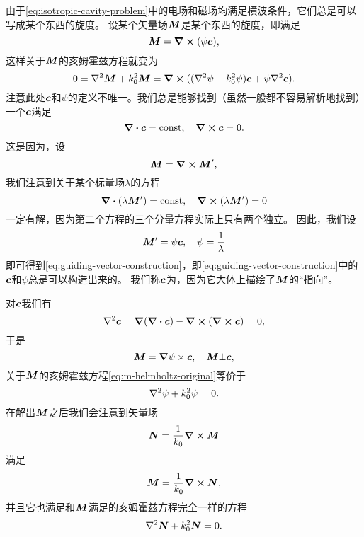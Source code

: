由于\eqref{eq:isotropic-cavity-problem}中的电场和磁场均满足横波条件，它们总是可以写成某个东西的旋度。
设某个矢量场$\vb*{M}$是某个东西的旋度，即满足
\begin{equation}
    {\vb*{M}} = \curl{(\psi \vb*{c})},
    \label{eq:guiding-vector-construction}
\end{equation}
这样关于$\vb*{M}$的亥姆霍兹方程就变为
\begin{equation}
    0 = \laplacian {\vb*{M}} + k_0^2 {\vb*{M}} = \curl{((\laplacian \psi + k_0^2 \psi) \vb*{c} + \psi \laplacian \vb*{c})}.
    \label{eq:m-helmholtz-original}
\end{equation}
注意此处$\vb*{c}$和$\psi$的定义不唯一。我们总是能够找到（虽然一般都不容易解析地找到）一个$\vb*{c}$满足
\begin{equation}
    \div{\vb*{c}} = \text{const}, \quad \curl{\vb*{c}} = 0.
\end{equation}
这是因为，设
\[
    \vb*{M} = \curl{\vb*{M}'},
\]
我们注意到关于某个标量场$\lambda$的方程
\[
    \div{(\lambda \vb*{M}')} = \text{const}, \quad \curl{(\lambda \vb*{M}')} = 0
\]
一定有解，因为第二个方程的三个分量方程实际上只有两个独立。
因此，我们设
\[
    \vb*{M}' = \psi \vb*{c}, \quad \psi = \frac{1}{\lambda}
\]
即可得到\eqref{eq:guiding-vector-construction}，即\eqref{eq:guiding-vector-construction}中的$\vb*{c}$和$\psi$总是可以构造出来的。
我们称$\vb*{c}$为，因为它大体上描绘了$\vb*{M}$的“指向”。

对$\vb*{c}$我们有
\[
    \laplacian \vb*{c} = \grad(\div{\vb*{c}}) - \curl{(\curl{\vb*{c}})} = 0,
\]
于是
\begin{equation}
    \vb*{M} = \grad{\psi} \times \vb*{c}, \quad \vb*{M} \bot \vb*{c},
\end{equation}
关于$\vb*{M}$的亥姆霍兹方程\eqref{eq:m-helmholtz-original}等价于
\begin{equation}
    \laplacian \psi + k_0^2 \psi = 0.
    \label{eq:scalar-cavity-eq}
\end{equation}
在解出$\vb*{M}$之后我们会注意到矢量场
\begin{equation}
    \vb*{N} = \frac{1}{k_0} \curl{\vb*{M}}
    \label{eq:cavity-n-def}
\end{equation}
满足
\begin{equation}
    \vb*{M} = \frac{1}{k_0} \curl{\vb*{N}}, 
\end{equation}
并且它也满足和$\vb*{M}$满足的亥姆霍兹方程完全一样的方程
\begin{equation}
    \laplacian \vb*{N} + k_0^2 \vb*{N} = 0.
\end{equation}

